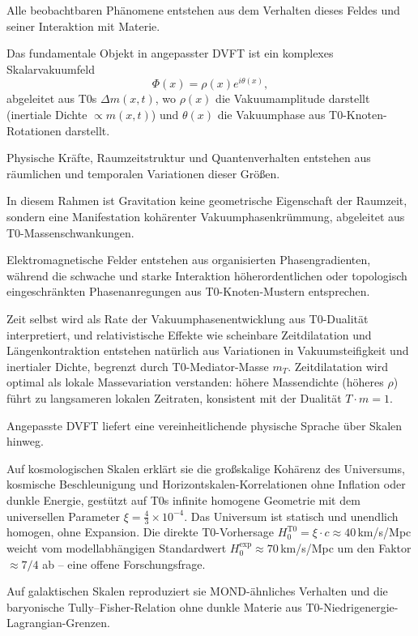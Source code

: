 \documentclass[12pt,a4paper]{article}
\begin{document}
	Alle beobachtbaren Phänomene entstehen aus dem Verhalten dieses Feldes und seiner Interaktion mit Materie.
	
	Das fundamentale Objekt in angepasster DVFT ist ein komplexes Skalarvakuumfeld
	\[
	\Phi(x)=\rho(x)e^{i\theta(x)},
	\]
	abgeleitet aus T0s $\Delta m(x,t)$, wo $\rho(x)$ die Vakuumamplitude darstellt (inertiale Dichte $\propto m(x,t)$) und $\theta(x)$
	die Vakuumphase aus T0-Knoten-Rotationen darstellt.
	
	Physische Kräfte, Raumzeitstruktur und Quantenverhalten entstehen aus räumlichen und temporalen Variationen dieser Größen.
	
	In diesem Rahmen ist Gravitation keine geometrische Eigenschaft der Raumzeit, sondern eine Manifestation kohärenter Vakuumphasenkrümmung, abgeleitet aus T0-Massenschwankungen.
	
	Elektromagnetische Felder entstehen aus organisierten Phasengradienten, während die schwache und starke Interaktion höherordentlichen oder topologisch eingeschränkten Phasenanregungen aus T0-Knoten-Mustern entsprechen.
	
	Zeit selbst wird als Rate der Vakuumphasenentwicklung aus T0-Dualität interpretiert, und relativistische Effekte wie scheinbare Zeitdilatation und Längenkontraktion entstehen natürlich aus Variationen in Vakuumsteifigkeit und inertialer Dichte, begrenzt durch T0-Mediator-Masse $m_T$. Zeitdilatation wird optimal als lokale Massevariation verstanden: höhere Massendichte (höheres $\rho$) führt zu langsameren lokalen Zeitraten, konsistent mit der Dualität $T \cdot m = 1$.
	
	Angepasste DVFT liefert eine vereinheitlichende physische Sprache über Skalen hinweg.
	
	Auf kosmologischen Skalen erklärt sie die großskalige Kohärenz des Universums, kosmische Beschleunigung und Horizontskalen-Korrelationen ohne Inflation oder dunkle Energie, gestützt auf T0s infinite homogene Geometrie mit dem universellen Parameter $\xi = \frac{4}{3} \times 10^{-4}$. Das Universum ist statisch und unendlich homogen, ohne Expansion. Die direkte T0-Vorhersage $H_0^{\text{T0}} = \xi \cdot c \approx 40\,$km/s/Mpc weicht vom modellabhängigen Standardwert $H_0^{\text{exp}} \approx 70\,$km/s/Mpc um den Faktor $\approx 7/4$ ab -- eine offene Forschungsfrage.
	
	Auf galaktischen Skalen reproduziert sie MOND-ähnliches Verhalten und die baryonische Tully–Fisher-Relation ohne dunkle Materie aus T0-Niedrigenergie-Lagrangian-Grenzen.
	
\end{document}
